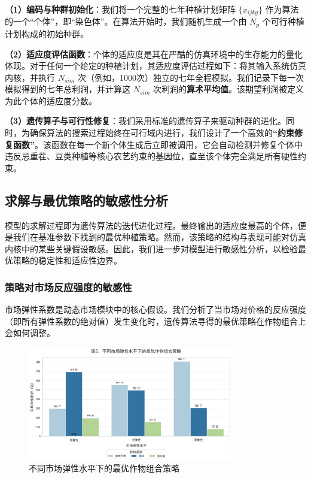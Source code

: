 \documentclass[withoutpreface,bwprint]{cumcmthesis} %
\begin{document}
\textbf{（1）编码与种群初始化}：我们将一个完整的七年种植计划矩阵 $\{x_{ijky}\}$ 作为算法的一个“个体”，即“染色体”。在算法开始时，我们随机生成一个由 $N_p$ 个可行种植计划构成的初始种群。

\textbf{（2）适应度评估函数}：个体的适应度是其在严酷的仿真环境中的生存能力的量化体现。对于任何一个给定的种植计划，其适应度评估过程如下：将其输入系统仿真内核，并执行 $N_{sim}$ 次（例如，1000次）独立的七年全程模拟。我们记录下每一次模拟得到的七年总利润，并计算这 $N_{sim}$ 次利润的\textbf{算术平均值}。该期望利润被定义为此个体的适应度分数。

\textbf{（3）遗传算子与可行性修复}：我们采用标准的遗传算子来驱动种群的进化。同时，为确保算法的搜索过程始终在可行域内进行，我们设计了一个高效的\textbf{“约束修复函数”}。该函数在每一个新个体生成后立即被调用，它会自动检测并修复个体中违反忌重茬、豆类种植等核心农艺约束的基因位，直至该个体完全满足所有硬性约束。

\subsection{求解与最优策略的敏感性分析}

模型的求解过程即为遗传算法的迭代进化过程。最终输出的适应度最高的个体，便是我们在基准参数下找到的最优种植策略。然而，该策略的结构与表现可能对仿真内核中的某些关键假设敏感。因此，我们进一步对模型进行敏感性分析，以检验最优策略的稳定性和适应性边界。

\subsubsection{策略对市场反应强度的敏感性}

市场弹性系数是动态市场模块中的核心假设。我们分析了当市场对价格的反应强度（即所有弹性系数的绝对值）发生变化时，遗传算法寻得的最优策略在作物组合上会如何调整。

\begin{figure}[htbp]
    \centering
    \includegraphics[width=0.8\textwidth]{figures/3_1.png}
    \caption{不同市场弹性水平下的最优作物组合策略}
    \label{fig:3_1}
\end{figure}
\end{document}
